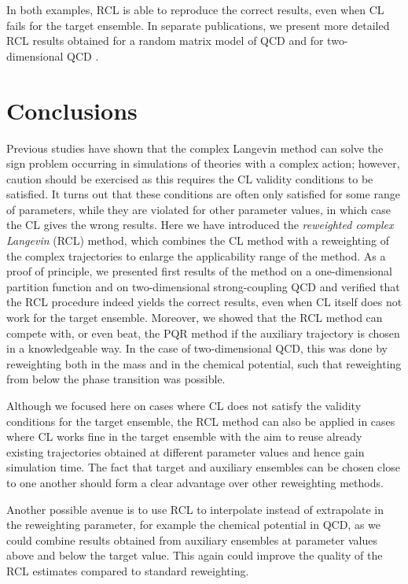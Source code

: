\documentclass[prd,showpacs,reprint,nofootinbib,showkeys]{revtex4-1}
\begin{document}
In both examples, RCL is able to reproduce the correct results, even when CL fails for the target ensemble. In separate publications, we present more detailed RCL results obtained for a random matrix model of QCD \cite{Bloch:2016jwt} and for two-dimensional QCD \cite{Bloch:2017sfg}. 


\section{Conclusions}
\label{sec:conclusions}

Previous studies have shown that the complex Langevin method can solve the sign problem occurring in simulations of theories with a complex action; however, caution should be exercised as this requires the CL validity conditions to be satisfied. It turns out that these conditions are often only satisfied for some range of parameters, while they are violated for other parameter values, in which case the CL gives the wrong results. Here we have introduced the \textit{reweighted complex Langevin} (RCL) method, which combines the CL method with a reweighting of the complex trajectories to enlarge the applicability range of the method. As a proof of principle, we presented first results of the method on a one-dimensional partition function and on two-dimensional strong-coupling QCD and verified that the RCL procedure indeed yields the correct results, even when CL itself does not work for the target ensemble. Moreover, we showed that the RCL method can compete with, or even beat, the PQR method if the auxiliary trajectory is chosen in a knowledgeable way.
In the case of two-dimensional QCD, this was done by reweighting both in the mass and in the chemical potential, such that reweighting from below the phase transition was possible.

Although we focused here on cases where CL does not satisfy the validity conditions for the target ensemble, the RCL method can also be applied in cases where CL works fine in the target ensemble with the aim to reuse already existing trajectories obtained at different parameter values and hence gain simulation time. The fact that target and auxiliary ensembles can be chosen close to one another should form a clear advantage over other reweighting methods.

Another possible avenue is to use RCL to interpolate instead of extrapolate in the reweighting parameter, for example the chemical potential in QCD, as we could combine results obtained from auxiliary ensembles at parameter values above and below the target value. This again could improve the quality of the RCL estimates compared to standard reweighting.
\end{document}
